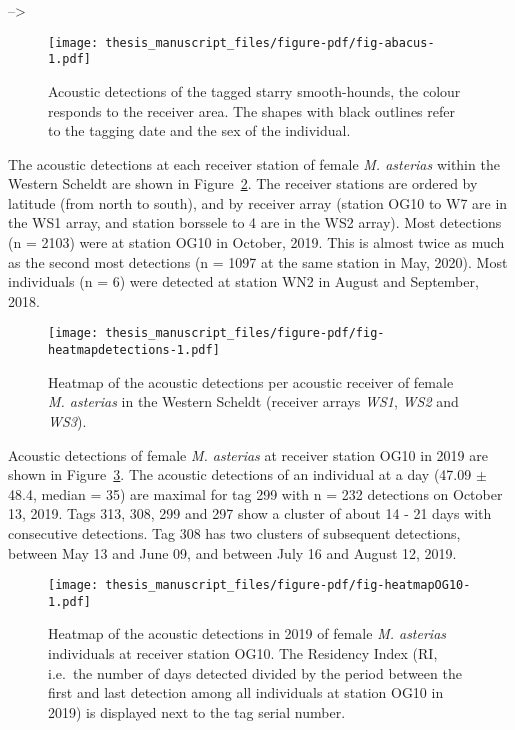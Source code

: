 \documentclass[
  authoryear,
  review,
  3p]{elsarticle}
\begin{document}
--\textgreater{}

\begin{figure}[H]

{\centering \texttt{[image: thesis\_manuscript\_files/figure-pdf/fig-abacus-1.pdf]}

}

\caption{\label{fig-abacus}Acoustic detections of the tagged starry
smooth-hounds, the colour responds to the receiver area. The shapes with
black outlines refer to the tagging date and the sex of the individual.}

\end{figure}

The acoustic detections at each receiver station of female \emph{M.
asterias} within the Western Scheldt are shown in
Figure~\ref{fig-heatmapdetections}. The receiver stations are ordered by
latitude (from north to south), and by receiver array (station OG10 to
W7 are in the WS1 array, and station borssele to 4 are in the WS2
array). Most detections (n = 2103) were at station OG10 in October,
2019. This is almost twice as much as the second most detections (n =
1097 at the same station in May, 2020). Most individuals (n = 6) were
detected at station WN2 in August and September, 2018.

\begin{figure}[H]

{\centering \texttt{[image: thesis\_manuscript\_files/figure-pdf/fig-heatmapdetections-1.pdf]}

}

\caption{\label{fig-heatmapdetections}Heatmap of the acoustic detections
per acoustic receiver of female \emph{M. asterias} in the Western
Scheldt (receiver arrays \emph{WS1}, \emph{WS2} and \emph{WS3}).}

\end{figure}

Acoustic detections of female \emph{M. asterias} at receiver station
OG10 in 2019 are shown in Figure~\ref{fig-heatmapOG10}. The acoustic
detections of an individual at a day (47.09 \(\pm\) 48.4, median = 35)
are maximal for tag 299 with n = 232 detections on October 13, 2019.
Tags 313, 308, 299 and 297 show a cluster of about 14 - 21 days with
consecutive detections. Tag 308 has two clusters of subsequent
detections, between May 13 and June 09, and between July 16 and August
12, 2019.

\begin{figure}[H]

{\centering \texttt{[image: thesis\_manuscript\_files/figure-pdf/fig-heatmapOG10-1.pdf]}

}

\caption{\label{fig-heatmapOG10}Heatmap of the acoustic detections in
2019 of female \emph{M. asterias} individuals at receiver station OG10.
The Residency Index (RI, i.e.~the number of days detected divided by the
period between the first and last detection among all individuals at
station OG10 in 2019) is displayed next to the tag serial number.}

\end{figure}
\end{document}
